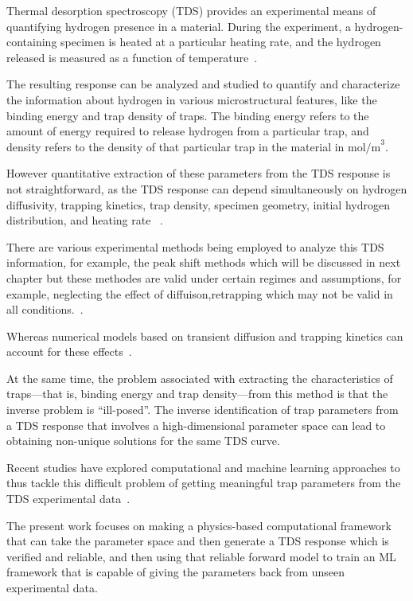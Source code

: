 \documentclass[a4paper,12pt,oneside]{report}
\begin{document}
Thermal desorption spectroscopy (TDS) provides an experimental means of quantifying hydrogen presence in a material. During the experiment, a hydrogen-containing specimen is heated at a particular heating rate, and the hydrogen released is measured as a function of temperature~\cite{Legrand2015,Turnbull1997}.

The resulting response can be analyzed and studied to quantify and characterize the information about hydrogen in various microstructural features, like the binding energy and trap density of traps. The binding energy refers to the amount of energy required to release hydrogen from a particular trap, and density refers to the density of that particular trap in the material in $\text{mol/m}^3$.

However quantitative extraction of these parameters from the TDS response is not straightforward, as the TDS response can depend simultaneously on hydrogen diffusivity, trapping kinetics, trap density, specimen geometry, initial hydrogen distribution, and heating rate    ~\cite{Legrand2015,Turnbull1997,Diaz2020}.

There are various experimental methods being employed to analyze this TDS information, for example, the peak shift methods which will be discussed in next chapter but these methodes are valid under certain regimes and assumptions, for example, neglecting the effect of diffuison,retrapping which may not be valid in all conditions.~\cite{Lee1986,Wei2012}.

Whereas numerical models based on transient diffusion and trapping kinetics can account for these effects~\cite{Legrand2015,Turnbull1997,Drexler2019}.

At the same time, the problem associated with extracting the characteristics of traps---that is, binding energy and trap density---from this method is that the inverse problem is ``ill-posed''. The inverse identification of trap parameters from a TDS response that involves a high-dimensional parameter space can lead to obtaining non-unique solutions for the same TDS curve.

Recent studies have explored computational and machine learning approaches to thus tackle this difficult problem of getting meaningful trap parameters from the TDS experimental data~\cite{Marrani2025,Yang2025}.

The present work focuses on making a physics-based computational framework that can take the parameter space and then generate a TDS response which is verified and reliable, and then using that reliable forward model to train an ML framework that is capable of giving the parameters back from unseen experimental data.
\end{document}
